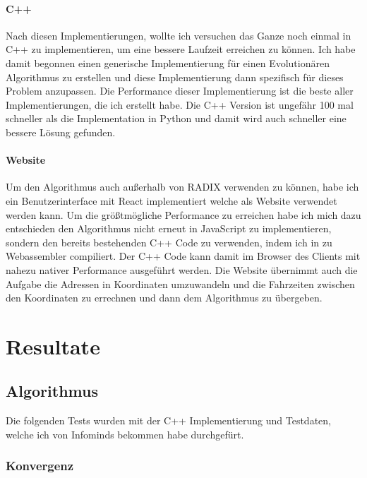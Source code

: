 \documentclass[a4paper,notitlepage,12pt]{report}
\begin{document}
\subsubsection{C++}

Nach diesen Implementierungen, wollte ich versuchen das Ganze noch einmal in C++
zu implementieren, um eine bessere Laufzeit erreichen zu können. Ich habe damit
begonnen einen generische Implementierung für einen Evolutionären Algorithmus zu
erstellen und diese Implementierung dann spezifisch für dieses Problem anzupassen.
Die Performance dieser Implementierung ist die beste aller Implementierungen, die
ich erstellt habe. Die C++ Version ist ungefähr 100 mal schneller als die
Implementation in Python und damit wird auch schneller eine bessere Lösung
gefunden.

\subsubsection{Website}

Um den Algorithmus auch außerhalb von RADIX verwenden zu können, habe ich ein
Benutzerinterface mit React  implementiert welche als Website verwendet werden
kann. Um die größtmögliche Performance zu erreichen habe ich mich dazu entschieden
den Algorithmus nicht erneut in JavaScript zu implementieren, sondern den bereits
bestehenden C++ Code zu verwenden, indem ich in zu Webassembler  compiliert. Der
C++ Code kann damit im Browser des Clients mit nahezu nativer Performance
ausgeführt werden. Die Website übernimmt auch die Aufgabe die Adressen in
Koordinaten umzuwandeln und die Fahrzeiten zwischen den Koordinaten zu errechnen
und dann dem Algorithmus zu übergeben.

\chapter{Resultate}

\section{Algorithmus}

Die folgenden Tests wurden mit der C++ Implementierung und Testdaten, welche
ich von Infominds bekommen habe durchgefürt.

\subsection{Konvergenz}
\end{document}
